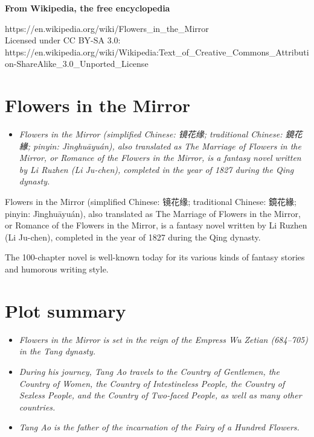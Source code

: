 \textbf{From Wikipedia, the free encyclopedia}

https://en.wikipedia.org/wiki/Flowers\_in\_the\_Mirror\\
Licensed under CC BY-SA 3.0:\\
https://en.wikipedia.org/wiki/Wikipedia:Text\_of\_Creative\_Commons\_Attribution-ShareAlike\_3.0\_Unported\_License

\section{Flowers in the Mirror}\label{flowers-in-the-mirror}

\begin{itemize}
\item
  \emph{Flowers in the Mirror (simplified Chinese: 镜花缘; traditional
  Chinese: 鏡花緣; pinyin: Jìnghuāyuán), also translated as The Marriage
  of Flowers in the Mirror, or Romance of the Flowers in the Mirror, is
  a fantasy novel written by Li Ruzhen (Li Ju-chen), completed in the
  year of 1827 during the Qing dynasty.}
\end{itemize}

Flowers in the Mirror (simplified Chinese: 镜花缘; traditional Chinese:
鏡花緣; pinyin: Jìnghuāyuán), also translated as The Marriage of Flowers
in the Mirror, or Romance of the Flowers in the Mirror, is a fantasy
novel written by Li Ruzhen (Li Ju-chen), completed in the year of 1827
during the Qing dynasty.

The 100-chapter novel is well-known today for its various kinds of
fantasy stories and humorous writing style.

\section{Plot summary}\label{plot-summary}

\begin{itemize}
\item
  \emph{Flowers in the Mirror is set in the reign of the Empress Wu
  Zetian (684--705) in the Tang dynasty.}
\item
  \emph{During his journey, Tang Ao travels to the Country of Gentlemen,
  the Country of Women, the Country of Intestineless People, the Country
  of Sexless People, and the Country of Two-faced People, as well as
  many other countries.}
\item
  \emph{Tang Ao is the father of the incarnation of the Fairy of a
  Hundred Flowers.}
\end{itemize}

